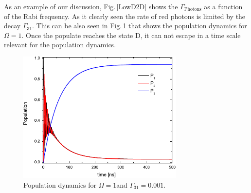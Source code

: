 As an example of our discussion, Fig.\,\ref{LowD2D} shows the $\Gamma_{\text{Photons}}$ as a function of the Rabi frequency. As it clearly seen the rate of red photons is limited by the decay $\Gamma_{31}$.  This can be also seen in Fig.\,\ref{LowDPopu} that shows the population dynamics for $\Omega=1$\ns. Once the populate reaches the state D, it can not escape in a time scale relevant for the population dynamics. 

\begin{figure}[ht!]
\begin{center}
\includegraphics[width=8.3cm, height=6.6cm]{imgs/LowDPopu.pdf}
\caption{\label{LowDPopu} Population dynamics for $\Omega=1$\ns and  $\Gamma_{31}=0.001$\ns.}
\end{center}
\end{figure}
 
